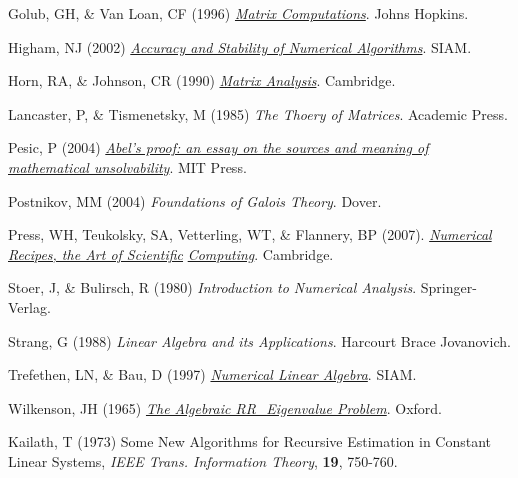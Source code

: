 \noindent Golub, GH, \& Van Loan, CF (1996) \href{http://books.google.com/books?id=mlOa7wPX6OYC&printsec=frontcover}{\it Matrix Computations}. Johns Hopkins.\vskip0.1in

\noindent Higham, NJ (2002) \href{http://books.google.com/books?id=epilvM5MMxwC&printsec=frontcover}{\it Accuracy and Stability of Numerical Algorithms}.  SIAM.\vskip0.1in

\noindent Horn, RA, \& Johnson, CR (1990) \href{http://books.google.com/books?id=9wTacOjHE6IC&printsec=frontcover}{\it Matrix Analysis}.  Cambridge.\vskip0.1in

\noindent Lancaster, P, \& Tismenetsky, M (1985) {\it The Thoery of Matrices}.  Academic Press.\vskip0.1in

\noindent Pesic, P (2004) \href{http://books.google.com/books?id=nIpGp9Y5AlEC&printsec=frontcover}{\it Abel's proof:
an essay on the sources and meaning of mathematical unsolvability}.  MIT Press.

\noindent Postnikov, MM (2004) {\it Foundations of Galois Theory}. Dover.\vskip0.1in

\noindent Press, WH, Teukolsky, SA, Vetterling, WT, \& Flannery, BP (2007). \href{http://www.nr.com/}{\it Numerical Recipes, the Art of Scientific}
\href{http://www.nr.com/}{\it Computing}. Cambridge.\vskip0.1in

\noindent Stoer, J, \& Bulirsch, R (1980) {\it Introduction to Numerical Analysis}.  Springer-Verlag.\vskip0.1in

\noindent Strang, G (1988) {\it Linear Algebra and its Applications}.  Harcourt Brace Jovanovich.\vskip0.1in

\noindent Trefethen, LN, \& Bau, D (1997) \href{http://books.google.com/books?id=bj-Lu6zjWbEC&printsec=frontcover}{\it Numerical Linear Algebra}.  SIAM.\vskip0.1in

\noindent Wilkenson, JH (1965) \href{http://books.google.com/books?id=5wsK1OP7UFgC&printsec=frontcover}{\it The Algebraic RR_Eigenvalue Problem}.  Oxford.\vskip0.1in

\noindent Kailath, T (1973) Some New Algorithms for Recursive Estimation in Constant Linear Systems, {\it IEEE Trans. Information Theory}, {\bf 19}, 750-760.
